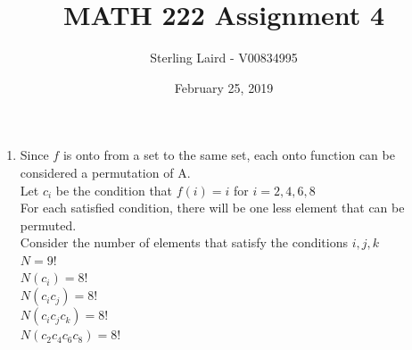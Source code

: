\documentclass[11pt]{article}
\title{MATH 222 Assignment 4}
\author{Sterling Laird - V00834995}
\date{February 25, 2019}
\begin{document}
\maketitle
\pagebreak

\begin{enumerate}[]
\item
Since $f$ is onto from a set to the same set, each onto function can be considered a permutation of A.\\
Let $c_i$ be the condition that $f(i)=i$ for $i=2,4,6,8$\\
For each satisfied condition, there will be one less element that can be permuted.\\
Consider the number of elements that satisfy the conditions $i,j,k$\\
$N=9!$\\
$N(c_i)=8!$\\
$N(c_ic_j)=8!$\\
$N(c_ic_jc_k)=8!$\\
$N(c_2c_4c_6c_8)=8!$\\


\end{enumerate}
\end{document}

